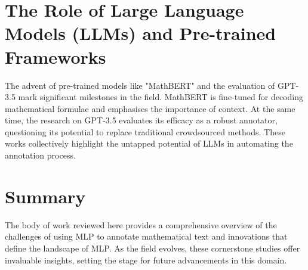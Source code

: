 \section{The Role of Large Language Models (LLMs) and Pre-trained Frameworks}

The advent of pre-trained models like "MathBERT" \citep{peng2021mathbert} and the evaluation of GPT-3.5 \citep{he2023annollm} mark significant milestones in the field. MathBERT is fine-tuned for decoding mathematical formulae and emphasises the importance of context. At the same time, the research on GPT-3.5 evaluates its efficacy as a robust annotator, questioning its potential to replace traditional crowdsourced methods. These works collectively highlight the untapped potential of \ac{LLMs} in automating the annotation process.

\section{Summary}

The body of work reviewed here provides a comprehensive overview of the challenges of using \ac{MLP} to annotate mathematical text and innovations that define the landscape of \ac{MLP}. As the field evolves, these cornerstone studies offer invaluable insights, setting the stage for future advancements in this domain.
